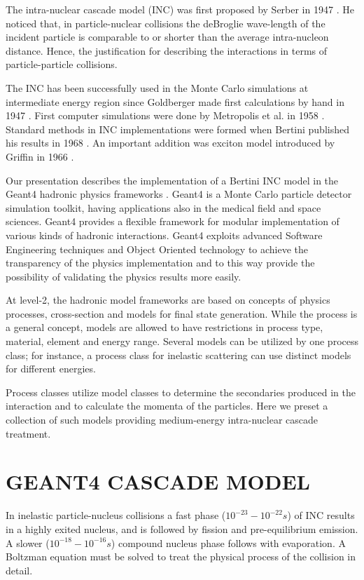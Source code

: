 \documentclass[twocolumn,twoside,slac,floatfix]{revtex4}
\begin{document}
The intra-nuclear cascade model (INC) was first proposed by Serber in 1947 \cite{serber47}.  
He noticed that, in particle-nuclear collisions the deBroglie wave-length of the incident particle is 
comparable to or shorter than the average intra-nucleon distance.
Hence, the justification for describing the interactions in terms of particle-particle  collisions.

The INC has been successfully used in the Monte Carlo simulations at intermediate energy region 
since Goldberger made first calculations by hand in 1947 \cite{goldberger48}. 
First computer simulations were done by Metropolis et al. in 1958 \cite{metropolis58}. 
Standard methods in INC implementations were formed when Bertini published his results in 1968 \cite{bertini68}.
An important addition was exciton model introduced by Griffin in 1966 \cite{griffin66}. 

Our presentation describes the implementation of a Bertini INC model in the Geant4 hadronic physics frameworks \cite{geant4collaboration03}.
Geant4\cite{geant4} is a Monte Carlo particle detector simulation toolkit, having applications also in the medical field and space
sciences. 
Geant4 provides a flexible framework for modular implementation of
various kinds of hadronic interactions. 
Geant4 exploits advanced Software Engineering techniques and Object
Oriented technology to achieve the transparency of the physics
implementation and to this way provide the possibility of validating the
physics results more easily. 

At level-2, the hadronic model frameworks are based on concepts of physics
processes, cross-section and models for final state generation. While the process is a general concept, models
are allowed to have restrictions in process type, material, element
and energy range.  Several models can be utilized by one process class; for instance, a
process class for inelastic scattering can use distinct models for different energies.


Process classes utilize model classes to determine the
secondaries produced in the interaction and to calculate the momenta
of the particles. Here we preset a collection of such models providing medium-energy
intra-nuclear cascade treatment.


\section{GEANT4 CASCADE MODEL}

In inelastic particle-nucleus collisions a fast phase ($10^{-23} - 10^{-22} s$) of INC results in a highly exited nucleus, 
and is followed by fission and pre-equilibrium emission. 
A slower ($10^{-18} - 10^{-16} s$) compound nucleus phase follows with evaporation.
A Boltzman equation must be solved to treat the physical process of the collision in detail.
 
\end{document}
